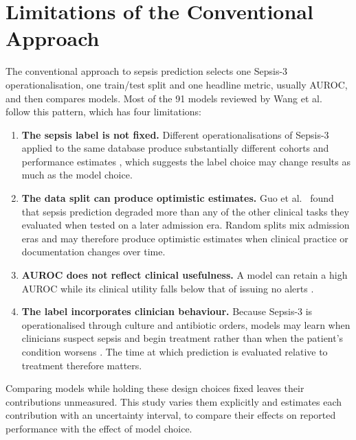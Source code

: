 \section{Limitations of the Conventional Approach}

The conventional approach to sepsis prediction selects one Sepsis-3
operationalisation, one train/test split and one headline metric, usually
AUROC, and then compares models. Most of the 91 models reviewed by Wang et al.\
\cite{wang2025srpm} follow this pattern, which has four limitations:

\begin{enumerate}
    \item \textbf{The sepsis label is not fixed.} Different operationalisations
    of Sepsis-3 applied to the same database produce substantially different
    cohorts and performance estimates \cite{cohen2024subtle}, which suggests
    the label choice may change results as much as the model choice.

    \item \textbf{The data split can produce optimistic estimates.} Guo et al.\
    \cite{guo2022temporal} found that sepsis prediction degraded more than any
    of the other clinical tasks they evaluated when tested on a later admission
    era. Random splits mix admission eras and may therefore produce optimistic
    estimates when clinical practice or documentation changes over time.

    \item \textbf{AUROC does not reflect clinical usefulness.} A model can
    retain a high AUROC while its clinical utility falls below that of issuing
    no alerts \cite{wang2025srpm}.

    \item \textbf{The label incorporates clinician behaviour.} Because
    Sepsis-3 is operationalised through culture and antibiotic orders, models
    may learn when clinicians suspect sepsis and begin treatment rather than
    when the patient's condition worsens \cite{kamran2024evaluation}. The time
    at which prediction is evaluated relative to treatment therefore matters.
\end{enumerate}

Comparing models while holding these design choices fixed leaves their
contributions unmeasured. This study varies them explicitly and estimates each
contribution with an uncertainty interval, to compare their effects on
reported performance with the effect of model choice.


